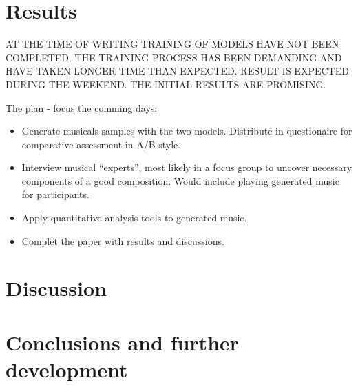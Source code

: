 \documentclass{IEEEtran}
\begin{document}
    \section{Results}
        AT THE TIME OF WRITING TRAINING OF MODELS HAVE NOT BEEN COMPLETED. THE TRAINING
        PROCESS HAS BEEN DEMANDING AND HAVE TAKEN LONGER TIME THAN EXPECTED. 
        RESULT IS EXPECTED DURING THE WEEKEND. THE INITIAL RESULTS ARE PROMISING.

        The plan - focus the comming days:
        \begin{itemize}
            \item Generate musicals samples with the two models. Distribute
                in questionaire for comparative assessment in A/B-style.
            \item Interview musical ``experts'', most likely in a focus group 
                to uncover necessary components of a good composition. Would 
                include playing generated music for participants.
            \item Apply quantitative analysis tools to generated music.
            \item Complet the paper with results and discussions.
        \end{itemize}
            

    
    \section{Discussion}
    
    \section{Conclusions and further development}

    \vfill
    \pagebreak
    
    \printbibliography
\end{document}
